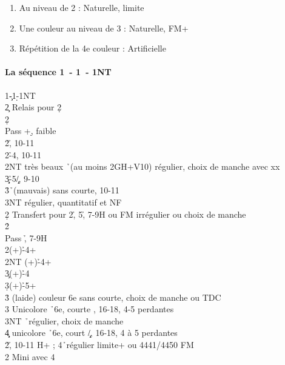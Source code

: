 \documentclass[a4paper]{article}
\begin{document}
\begin{enumerate}
\item Au niveau de 2 : Naturelle, limite

\item Une couleur au niveau de 3 : Naturelle, FM+

\item Répétition de la 4e couleur : Artificielle

\end{enumerate}

\paragraph{La séquence 1\pdfc\ - 1\pdfd\ - 1NT}

\begin{bidtable}
1\c-1\d-1NT\+\\
2\c \> Relais pour 2\d \+\\
2\d\+\\
Pass +\d , faible\\
2\h {}\h , 10-11\\
2\s {}\h -4\s , 10-11\\
2NT  très beaux \h\ (au moins 2GH+V10) régulier, choix de manche avec xx\\
3\c\d {}\h -5\c /\d , 9-10\\
3\h {}\h\ (mauvais) sans courte, 10-11\\
3NT \> régulier, quantitatif et NF\-\-\\
2\d \> Transfert pour 2\h , 5\h , 7-9H ou FM irrégulier ou choix de manche\+\\
2\h\+\\
Pass \h , 7-9H\\
2\s {}(+)\h -4+\s \\
2NT (+)\h -4+\c \\
3\c {}(+)\h -4\d \\
3\d {}(+)\h -5+\d \\
3\h \> (laide) couleur 6e sans courte, choix de manche ou TDC\\
3\s \> Unicolore \h\ 6e, courte \s , 16-18, 4-5 perdantes\\
3NT \h\ régulier, choix de manche\\
4\c\d \> unicolore \h\ 6e, court \c /\d , 16-18, 4 à 5 perdantes\-\-\\
2\h {}\h , 10-11 H+ ; 4\h\ régulier limite+ ou 4441/4450 FM\+\\
2\s \> Mini avec 4\s \\

\end{bidtable}
\end{document}

